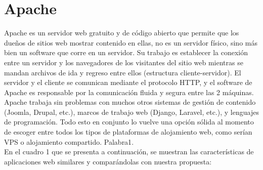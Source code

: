 \documentclass[12pt, a4paper, titlepage]{report}
\begin{document}
	    
	    
	    \section{Apache}
	 	Apache es un servidor web gratuito y de código abierto que permite que los dueños de sitios web mostrar contenido en ellas, no es un servidor físico, sino más bien un software que corre en un servidor.
	 	Su trabajo es establecer la conexión entre un servidor y los navegadores de los visitantes del sitio web mientras se mandan archivos de ida y regreso entre ellos (estructura cliente-servidor). El servidor y el cliente se comunican mediante el protocolo HTTP, y el software de Apache es responsable por la comunicación fluida y segura entre las 2 máquinas.
	 	Apache trabaja sin problemas con muchos otros sistemas de gestión de contenido (Joomla, Drupal, etc.), marcos de trabajo web (Django, Laravel, etc.), y lenguajes de programación. Todo esto en conjunto lo vuelve una opción sólida al momento de escoger entre todos los tipos de plataformas de alojamiento web, como serían VPS o alojamiento compartido.
	 	 \Gls{Palabra1}. \\
		
		\newpage
		En el cuadro 1 que se presenta a continuación, se muestran las características de aplicaciones web similares y comparándolas con nuestra propuesta:
		
\end{document}
